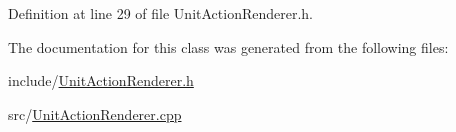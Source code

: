Definition at line 29 of file Unit\+Action\+Renderer.\+h.



The documentation for this class was generated from the following files\+:\begin{DoxyCompactItemize}
\item 
include/\hyperlink{UnitActionRenderer_8h}{Unit\+Action\+Renderer.\+h}\item 
src/\hyperlink{UnitActionRenderer_8cpp}{Unit\+Action\+Renderer.\+cpp}\end{DoxyCompactItemize}
